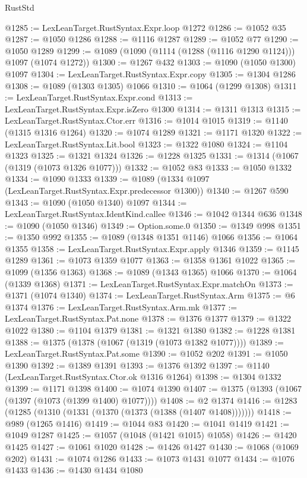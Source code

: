 \begin{lexlean}{RustStd}
\begin{coremodule}
@1285 := LexLeanTarget.RustSyntax.Expr.loop @1272
@1286 := @1052 @35
@1287 := @1050 @1286
@1288 := @1116 @1287
@1289 := @1052 @77
@1290 := @1050 @1289
@1299 := @1089 (@1090 (@1114 (@1288 (@1116 @1290 @1124))) @1097 (@1074 @1272))
@1300 := @1267 @432
@1303 := @1090 (@1050 @1300) @1097
@1304 := LexLeanTarget.RustSyntax.Expr.copy
@1305 := @1304 @1286
@1308 := @1089 (@1303 @1305) @1066
@1310 := @1064 (@1299 @1308)
@1311 := LexLeanTarget.RustSyntax.Expr.cond
@1313 := LexLeanTarget.RustSyntax.Expr.isZero @1300
@1314 := @1311 @1313
@1315 := LexLeanTarget.RustSyntax.Ctor.err
@1316 := @1014 @1015
@1319 := @1140 (@1315 @1316 @1264)
@1320 := @1074 @1289
@1321 := @1171 @1320
@1322 := LexLeanTarget.RustSyntax.Lit.bool
@1323 := @1322 @1080
@1324 := @1104 @1323
@1325 := @1321 @1324
@1326 := @1228 @1325
@1331 := @1314 (@1067 (@1319 (@1073 @1326 @1077)))
@1332 := @1052 @83
@1333 := @1050 @1332
@1334 := @1090 @1333
@1339 := @1089 (@1334 @1097 (LexLeanTarget.RustSyntax.Expr.predecessor @1300))
@1340 := @1267 @590
@1343 := @1090 (@1050 @1340) @1097
@1344 := LexLeanTarget.RustSyntax.IdentKind.callee
@1346 := @1042 @1344 @636
@1348 := @1090 (@1050 @1346)
@1349 := Option.some.{0}
@1350 := @1349 @998
@1351 := @1350 @992
@1355 := @1089 (@1348 @1351 @1146) @1066
@1356 := @1064 @1355
@1358 := LexLeanTarget.RustSyntax.Expr.apply @1346
@1359 := @1145 @1289
@1361 := @1073 @1359 @1077
@1363 := @1358 @1361 @1022
@1365 := @1099 (@1356 @1363)
@1368 := @1089 (@1343 @1365) @1066
@1370 := @1064 (@1339 @1368)
@1371 := LexLeanTarget.RustSyntax.Expr.matchOn
@1373 := @1371 (@1074 @1340)
@1374 := LexLeanTarget.RustSyntax.Arm
@1375 := @6 @1374
@1376 := LexLeanTarget.RustSyntax.Arm.mk
@1377 := LexLeanTarget.RustSyntax.Pat.none
@1378 := @1376 @1377
@1379 := @1322 @1022
@1380 := @1104 @1379
@1381 := @1321 @1380
@1382 := @1228 @1381
@1388 := @1375 (@1378 (@1067 (@1319 (@1073 @1382 @1077))))
@1389 := LexLeanTarget.RustSyntax.Pat.some
@1390 := @1052 @202
@1391 := @1050 @1390
@1392 := @1389 @1391
@1393 := @1376 @1392
@1397 := @1140 (LexLeanTarget.RustSyntax.Ctor.ok @1316 @1264)
@1398 := @1304 @1332
@1399 := @1171 @1398
@1400 := @1074 @1390
@1407 := @1375 (@1393 (@1067 (@1397 (@1073 (@1399 @1400) @1077))))
@1408 := @2 @1374
@1416 := @1283 (@1285 (@1310 (@1331 (@1370 (@1373 (@1388 (@1407 @1408)))))))
@1418 := @989 (@1265 @1416)
@1419 := @1044 @83
@1420 := @1041 @1419
@1421 := @1049 @1287
@1425 := @1057 (@1048 (@1421 @1015) @1058)
@1426 := @1420 @1425
@1427 := @1061 @1020
@1428 := @1426 @1427
@1430 := @1068 (@1069 @202)
@1431 := @1074 @1286
@1433 := @1073 @1431 @1077
@1434 := @1076 @1433
@1436 := @1430 @1434 @1080

\end{coremodule}
\end{lexlean}

